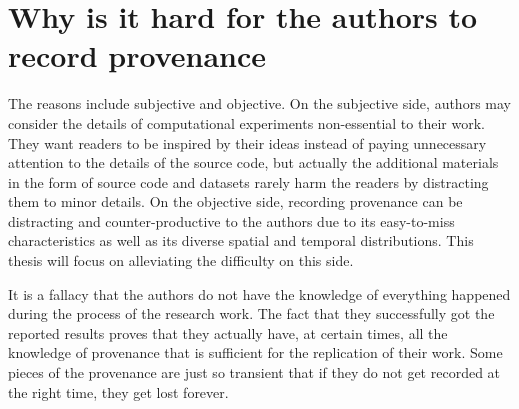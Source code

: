 \section{Why is it hard for the authors to record provenance}
The reasons include subjective and objective. On the subjective side, authors may consider the details of computational experiments non-essential to their work. They want readers to be inspired by their ideas instead of paying unnecessary attention to the details of the source code, but actually the additional materials in the form of source code and datasets rarely harm the readers by distracting them to minor details. On the objective side, recording provenance can be distracting and counter-productive to the authors due to its easy-to-miss characteristics as well as its diverse spatial and temporal distributions. This thesis will focus on alleviating the difficulty on this side.

It is a fallacy that the authors do not have the knowledge of everything happened during the process 
of the research work. The fact that they successfully got the reported results proves that they 
actually have, at certain times, all the knowledge of provenance that is sufficient for the 
replication of their work. Some pieces of the provenance are just so transient that if they do not 
get recorded at the right time, they get lost forever.

